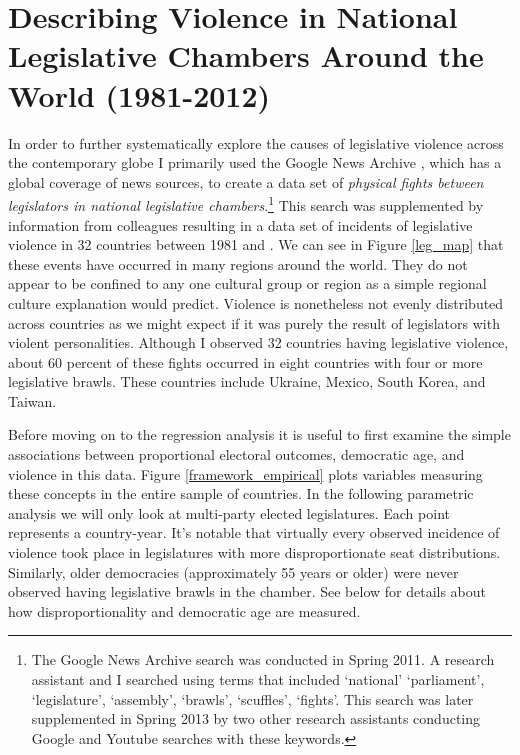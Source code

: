 \documentclass[a4paper]{article}\usepackage[]{graphicx}\usepackage[]{color}
\begin{document}
\section{Describing Violence in National Legislative Chambers Around the World (1981-2012)}

In order to further systematically explore the causes of legislative violence across the contemporary globe I primarily used the Google News Archive \citep{GoogleNews2011}, which has a global coverage of news sources, to create a data set of {\emph{physical fights between legislators in national legislative chambers}}.\footnote{The Google News Archive search was conducted in Spring 2011. A research assistant and I searched using terms that included `national' `parliament', `legislature', `assembly', `brawls', `scuffles', `fights'. This search was later supplemented in Spring 2013 by two other research assistants conducting Google and Youtube searches with these keywords.} This search was supplemented by information from colleagues resulting in a data set of  incidents of legislative violence in 32 countries between 1981 and . We can see in Figure \ref{leg_map} that these events have occurred in many regions around the world. They do not appear to be confined to any one cultural group or region as a simple regional culture explanation would predict. Violence is nonetheless not evenly distributed across countries as we might expect if it was purely the result of legislators with violent personalities. Although I observed 32 countries having legislative violence, about 60 percent of these fights occurred in eight countries with four or more legislative brawls. These countries include Ukraine, Mexico, South Korea, and Taiwan.

Before moving on to the regression analysis it is useful to first examine the simple associations between proportional electoral outcomes, democratic age, and violence in this data. Figure \ref{framework_empirical} plots variables measuring these concepts in the entire sample of countries. In the following parametric analysis we will only look at multi-party elected legislatures. Each point represents a country-year. It's notable that virtually every observed incidence of violence took place in legislatures with more disproportionate seat distributions. Similarly, older democracies (approximately 55 years or older) were never observed having legislative brawls in the chamber. See below for details about how disproportionality and democratic age are measured.
\end{document}
